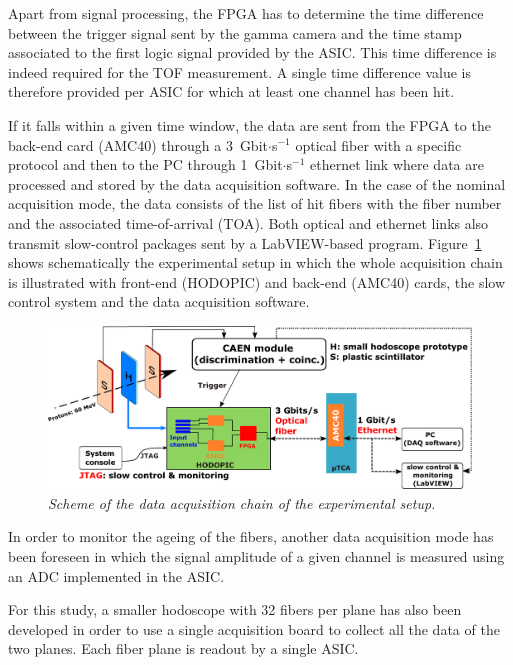 \documentclass[a4paper,11pt]{article}
\begin{document}
Apart from signal processing, the FPGA has to determine the time difference between the trigger signal sent by the gamma camera and the time stamp associated to the first logic signal provided by the ASIC. This time difference is indeed required for the TOF measurement. A single time difference value is therefore provided per ASIC for which at least one channel has been hit.

If it falls within a given time window, the data are sent from the FPGA to the back-end card (AMC40) \cite{Cachemiche2010} through a 3~Gbit$\cdot$s$^{-1}$ optical fiber with a specific protocol \cite{deng2013, Chen2017, Chen2019, Caplan2019} and then to the PC through 1~Gbit$\cdot$s$^{-1}$ ethernet link where data are processed and stored by the data acquisition software. In the case of the nominal acquisition mode, the data consists of the list of hit fibers with the fiber number and the associated time-of-arrival (TOA). Both optical and ethernet links also transmit slow-control packages sent by a LabVIEW-based program. Figure~\ref{fig:Scheme_Setup_hodo} shows schematically the experimental setup in which the whole acquisition chain is illustrated with front-end (HODOPIC) and back-end (AMC40) cards, the slow control system  and the data acquisition software.

\begin{figure}[htb]
\centering
\includegraphics[width=1\textwidth]{figures/Scheme_Setup_Nice_08_2019.pdf}
\caption{\small{\textit{Scheme of the data acquisition chain of the experimental setup.}}}
\label{fig:Scheme_Setup_hodo}
\end{figure} 

In order to monitor the ageing of the fibers, another data acquisition mode has been foreseen in which the signal amplitude of a given channel is measured using an ADC implemented in the ASIC.

For this study, a smaller hodoscope with 32 fibers per plane has also been developed in order to use a single acquisition board to collect all the data of the two planes. Each fiber plane is readout by a single ASIC.
\end{document}
